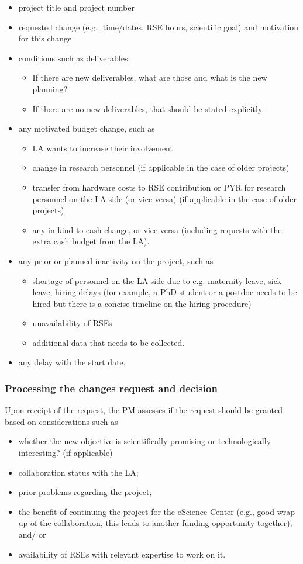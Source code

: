 \documentclass[11pt]{article}
\begin{document}
\begin{itemize}
\item project title and project number
\item requested change (e.g., time/dates, RSE hours, scientific goal) and motivation for this change
\item conditions such as deliverables: 
\begin{itemize}
\item If there are new deliverables, what are those and what is the new planning? 
\item If there are no new deliverables, that should be stated explicitly.
\end{itemize}
\item any motivated budget change, such as 
\begin{itemize}
\item LA wants to increase their involvement 
\item change in research personnel (if applicable in the case of older projects)
\item transfer from hardware costs to RSE contribution or PYR for research personnel on the LA side (or vice versa) (if
applicable in the case of older projects)
\item any in-kind to cash change, or vice versa (including requests with the extra cash budget from the LA).
\end{itemize}
\item any prior or planned inactivity on the project, such as
\begin{itemize}
\item shortage of personnel on the LA side due to e.g. maternity leave, sick leave, hiring delays (for example, a PhD student
or a postdoc needs to be hired but there is a concise timeline on the hiring procedure)
\item unavailability of RSEs 
\item additional data that needs to be collected.
\end{itemize}
\item any delay with the start date.
\end{itemize}


\subsubsection{Processing the changes request and decision}
Upon receipt of the request, the PM assesses if the request should be granted based on considerations such as 
\begin{itemize}
\item whether the new objective is scientifically promising or technologically interesting? (if applicable)
\item collaboration status with the LA;
\item prior problems regarding the project;
\item the benefit of continuing the project for the eScience Center (e.g., good wrap up of the collaboration, this leads to
another funding opportunity together); and/ or
\item availability of RSEs with relevant expertise to work on it.
\end{itemize}
\end{document}
